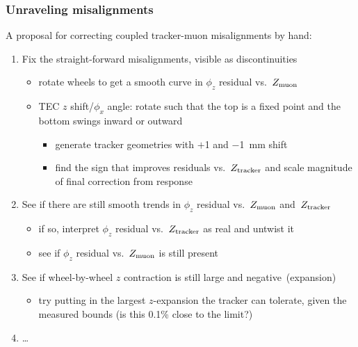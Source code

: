 \documentclass[compress]{beamer}
\begin{document}
\begin{frame}
\frametitle{Unraveling misalignments}

A proposal for correcting coupled tracker-muon misalignments by hand:

\vspace{-0.1 cm}
\begin{enumerate}
\item Fix the straight-forward misalignments, visible as discontinuities
\begin{itemize}\setlength{\itemsep}{0.1 cm}
\item rotate wheels to get a smooth curve in $\phi_z$ residual vs.\ $Z_{\mbox{\scriptsize muon}}$
\item TEC $z$ shift/$\phi_x$ angle: rotate such that the top is a fixed point and the bottom swings inward or outward
\begin{itemize}\setlength{\itemsep}{0.1 cm}
\item generate tracker geometries with $+$1 and $-$1~mm shift
\item find the sign that improves residuals vs.\ $Z_{\mbox{\scriptsize tracker}}$ and scale magnitude of final correction from response
\end{itemize}
\end{itemize}

\item See if there are still smooth trends in $\phi_z$ residual vs.\ $Z_{\mbox{\scriptsize muon}}$ \mbox{and $Z_{\mbox{\scriptsize tracker}}$\hspace{-1 cm}}
\begin{itemize}\setlength{\itemsep}{0.1 cm}
\item if so, interpret $\phi_z$ residual vs.\ $Z_{\mbox{\scriptsize tracker}}$ as real and untwist it
\item see if $\phi_z$ residual vs.\ $Z_{\mbox{\scriptsize muon}}$ is still present
\end{itemize}

\item See if wheel-by-wheel $z$ contraction is still large and \mbox{negative (expansion)\hspace{-1 cm}}
\begin{itemize}\setlength{\itemsep}{0.1 cm}
\item try putting in the largest $z$-expansion the tracker can
  tolerate, given the measured bounds (is this 0.1\% close to the limit?)
\end{itemize}

\item \ldots

\end{enumerate}
\label{numpages}
\end{frame}
\end{document}
